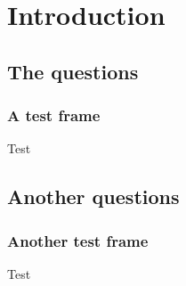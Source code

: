 \documentclass{beamer}
\begin{document}
\section{Introduction}
\subsection{The questions}
\begin{frame}\frametitle{A test frame}Test\end{frame}
\subsection{Another questions}
\begin{frame}\frametitle{Another test frame}Test\end{frame}
\end{document}
